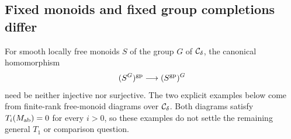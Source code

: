 \subsection{Fixed monoids and fixed group completions differ}

\begin{example}
\label{G:fixedgroupfailures}
For smooth locally free monoids $S$ of the group $G$ of $\mathcal C_\delta$,
the canonical homomorphism
\[
 (S^G)^{\mathrm{gp}}\longrightarrow (S^{\mathrm{gp}})^G
\]
need be neither injective nor surjective. The two explicit
examples below come from finite-rank free-monoid diagrams over
$\mathcal C_\delta$. Both diagrams satisfy $T_i(M_{\mathrm{ab}})=0$ for every
$i>0$, so these examples do not settle the remaining general
$T_1$ or comparison question.
\end{example}
